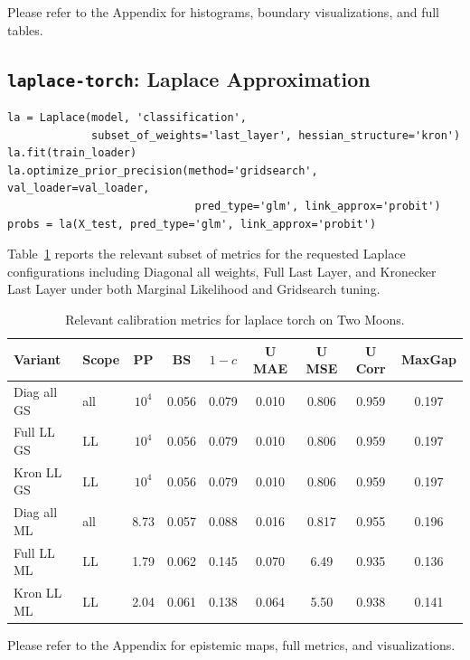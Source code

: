 \documentclass[12pt,a4paper]{article}
\begin{document}
Please refer to the Appendix for histograms, boundary visualizations, and full tables.

\subsection{\texttt{laplace-torch}: Laplace Approximation}
\label{sec:la}

\begin{lstlisting}[caption={Laplace post hoc workflow.}]
la = Laplace(model, 'classification',
             subset_of_weights='last_layer', hessian_structure='kron')
la.fit(train_loader)
la.optimize_prior_precision(method='gridsearch', val_loader=val_loader,
                             pred_type='glm', link_approx='probit')
probs = la(X_test, pred_type='glm', link_approx='probit')
\end{lstlisting}

Table~\ref{tab:la_main_subset} reports the relevant subset of metrics for the requested Laplace configurations including Diagonal all weights, Full Last Layer, and Kronecker Last Layer under both Marginal Likelihood and Gridsearch tuning.

\begin{table}[H]
  \centering
  \caption{Relevant calibration metrics for laplace torch on Two Moons.}
  \label{tab:la_main_subset}
  \small\setlength{\tabcolsep}{4pt}
  \begin{tabular}{llccccccc}
    \toprule
    Variant & Scope & PP & BS & $1 - c$ & U MAE & U MSE & U Corr & MaxGap \\
    \midrule
    Diag all GS & all & $10^4$ & 0.056 & 0.079 & 0.010 & 0.806 & 0.959 & 0.197 \\
    Full LL GS  & LL  & $10^4$ & 0.056 & 0.079 & 0.010 & 0.806 & 0.959 & 0.197 \\
    Kron LL GS  & LL  & $10^4$ & 0.056 & 0.079 & 0.010 & 0.806 & 0.959 & 0.197 \\
    Diag all ML & all & 8.73  & 0.057 & 0.088 & 0.016 & 0.817 & 0.955 & 0.196 \\
    Full LL ML  & LL  & 1.79  & 0.062 & 0.145 & 0.070 & 6.49  & 0.935 & 0.136 \\
    Kron LL ML  & LL  & 2.04  & 0.061 & 0.138 & 0.064 & 5.50  & 0.938 & 0.141 \\
    \bottomrule
  \end{tabular}
\end{table}

Please refer to the Appendix for epistemic maps, full metrics, and visualizations.
\end{document}
